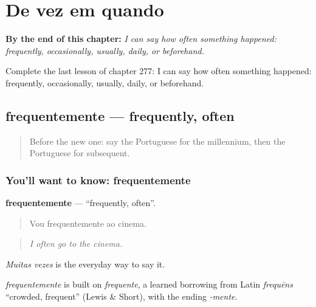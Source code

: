 
\chapter{De vez em quando}
\label{ch:pt-de-vez-em-quando}

\begin{chapteropening}
\textbf{By the end of this chapter:} \emph{I can say how often something happened: frequently, occasionally, usually, daily, or beforehand.}

Complete the last lesson of chapter 277: I can say how often something happened: frequently, occasionally, usually, daily, or beforehand.
\end{chapteropening}

\section[frequentemente]{frequentemente — frequently, often}

\label{lesson:PT-C277-frequentemente}



\begin{quote}
Before the new one: say the Portuguese for the millennium, then the Portuguese for subsequent.
\end{quote}

\subsection*{You'll want to know: frequentemente}
\textbf{frequentemente} — \textquotedblleft{}frequently, often\textquotedblright{}.

\begin{quote}
Vou frequentemente ao cinema.
\end{quote}

\begin{quote}
\emph{I often go to the cinema.}
\end{quote}

\emph{Muitas vezes} is the everyday way to say it.

\begin{cousinweb}
\emph{frequentemente} is built on \emph{frequente}, a learned borrowing from Latin \emph{frequēns} \textquotedblleft{}crowded, frequent\textquotedblright{} (Lewis \& Short), with the ending \emph{-mente}.
\end{cousinweb}

